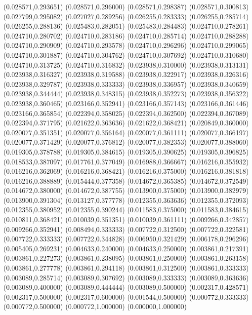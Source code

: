 (0.028571,0.293651)
(0.028571,0.296000)
(0.028571,0.298387)
(0.028571,0.300813)
(0.027799,0.295082)
(0.027027,0.289256)
(0.026255,0.283333)
(0.026255,0.285714)
(0.026255,0.288136)
(0.025483,0.282051)
(0.025483,0.284483)
(0.024710,0.278261)
(0.024710,0.280702)
(0.024710,0.283186)
(0.024710,0.285714)
(0.024710,0.288288)
(0.024710,0.290909)
(0.024710,0.293578)
(0.024710,0.296296)
(0.024710,0.299065)
(0.024710,0.301887)
(0.024710,0.304762)
(0.024710,0.307692)
(0.024710,0.310680)
(0.024710,0.313725)
(0.024710,0.316832)
(0.023938,0.310000)
(0.023938,0.313131)
(0.023938,0.316327)
(0.023938,0.319588)
(0.023938,0.322917)
(0.023938,0.326316)
(0.023938,0.329787)
(0.023938,0.333333)
(0.023938,0.336957)
(0.023938,0.340659)
(0.023938,0.344444)
(0.023938,0.348315)
(0.023938,0.352273)
(0.023938,0.356322)
(0.023938,0.360465)
(0.023166,0.352941)
(0.023166,0.357143)
(0.023166,0.361446)
(0.023166,0.365854)
(0.022394,0.358025)
(0.022394,0.362500)
(0.022394,0.367089)
(0.022394,0.371795)
(0.021622,0.363636)
(0.021622,0.368421)
(0.020849,0.360000)
(0.020077,0.351351)
(0.020077,0.356164)
(0.020077,0.361111)
(0.020077,0.366197)
(0.020077,0.371429)
(0.020077,0.376812)
(0.020077,0.382353)
(0.020077,0.388060)
(0.019305,0.378788)
(0.019305,0.384615)
(0.019305,0.390625)
(0.019305,0.396825)
(0.018533,0.387097)
(0.017761,0.377049)
(0.016988,0.366667)
(0.016216,0.355932)
(0.016216,0.362069)
(0.016216,0.368421)
(0.016216,0.375000)
(0.016216,0.381818)
(0.016216,0.388889)
(0.015444,0.377358)
(0.014672,0.365385)
(0.014672,0.372549)
(0.014672,0.380000)
(0.014672,0.387755)
(0.013900,0.375000)
(0.013900,0.382979)
(0.013900,0.391304)
(0.013127,0.377778)
(0.012355,0.363636)
(0.012355,0.372093)
(0.012355,0.380952)
(0.012355,0.390244)
(0.011583,0.375000)
(0.011583,0.384615)
(0.010811,0.368421)
(0.010039,0.351351)
(0.010039,0.361111)
(0.009266,0.342857)
(0.009266,0.352941)
(0.008494,0.333333)
(0.007722,0.312500)
(0.007722,0.322581)
(0.007722,0.333333)
(0.007722,0.344828)
(0.006950,0.321429)
(0.006178,0.296296)
(0.005405,0.269231)
(0.004633,0.240000)
(0.004633,0.250000)
(0.003861,0.217391)
(0.003861,0.227273)
(0.003861,0.238095)
(0.003861,0.250000)
(0.003861,0.263158)
(0.003861,0.277778)
(0.003861,0.294118)
(0.003861,0.312500)
(0.003861,0.333333)
(0.003089,0.285714)
(0.003089,0.307692)
(0.003089,0.333333)
(0.003089,0.363636)
(0.003089,0.400000)
(0.003089,0.444444)
(0.003089,0.500000)
(0.002317,0.428571)
(0.002317,0.500000)
(0.002317,0.600000)
(0.001544,0.500000)
(0.000772,0.333333)
(0.000772,0.500000)
(0.000772,1.000000)
(0.000000,1.000000)